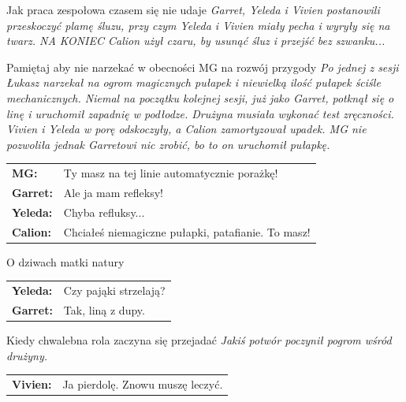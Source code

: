 \documentclass[10pt,twoside,twocolumn]{book}
\begin{document}
\begin{rpg-quotebox}{Jak praca zespołowa czasem się nie udaje}
   \textit{Garret, Yeleda i Vivien postanowili przeskoczyć plamę śluzu, przy czym Yeleda i Vivien miały pecha i wyryły się na twarz. NA KONIEC Calion użył czaru, by usunąć śluz i przejść bez szwanku...}
\end{rpg-quotebox}


\begin{rpg-quotebox}{Pamiętaj aby nie narzekać w obecności MG na rozwój przygody}
   \textit{Po jednej z sesji Łukasz narzekał na ogrom magicznych pułapek i niewielką ilość pułapek ściśle mechanicznych. Niemal na początku kolejnej sesji, już jako Garret, potknął się o linę i uruchomił zapadnię w podłodze. Drużyna musiała wykonać test zręczności. Vivien i Yeleda w porę odskoczyły, a Calion zamortyzował upadek. MG nie pozwoliła jednak Garretowi nic zrobić, bo to on uruchomił pułapkę.}\\
   \newline
   \begin{tabularx}{\columnwidth}{lX}
      \textbf{MG:} & Ty masz na tej linie automatycznie porażkę!\\
      \textbf{Garret:} & Ale ja mam refleksy!\\
      \textbf{Yeleda:} & Chyba refluksy...\\
      \textbf{Calion:} & Chciałeś niemagiczne pułapki, patafianie. To masz!\\
   \end{tabularx}
\end{rpg-quotebox}


\begin{rpg-quotebox}{O dziwach matki natury}
   \begin{tabularx}{\columnwidth}{lX}
      \textbf{Yeleda:} & Czy pająki strzelają?\\
      \textbf{Garret:} & Tak, liną z dupy.\\
   \end{tabularx}
\end{rpg-quotebox}


\begin{rpg-quotebox}{Kiedy chwalebna rola zaczyna się przejadać}
   \textit{Jakiś potwór poczynił pogrom wśród drużyny.}\\
   \newline
   \begin{tabularx}{\columnwidth}{lX}
      \textbf{Vivien:} & Ja pierdolę. Znowu muszę leczyć.\\
   \end{tabularx}
\end{rpg-quotebox}
\end{document}
